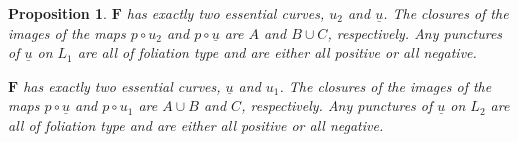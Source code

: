 \documentclass[12pt]{amsart}
\newtheorem{proposition}[theorem]{Proposition}
\theoremstyle{definition}
\begin{document}
\begin{proposition}
\bigskip


 $\mathbf{ F}$ has exactly two essential  curves, $u_2$ and $\underline{u}$. The closures of the images of the maps $p \circ u_2$ and $p \circ \underline{u}$  are $A$ and $B \cup C$, respectively. Any punctures of $\underline{u}$ on $L_1$ are all of foliation type and are either all positive or all negative. 








\bigskip


 $\mathbf{ F}$ has exactly two essential curves, $\underline{u}$ and $u_1$. The closures of the images of the maps $p \circ \underline{u}$ and $p \circ u_1$  are $A \cup B$ and $C$, respectively.  Any punctures of $\underline{u}$ on $L_2$ are all of foliation type and are either all positive or all negative. 








\end{proposition}
\end{document}
